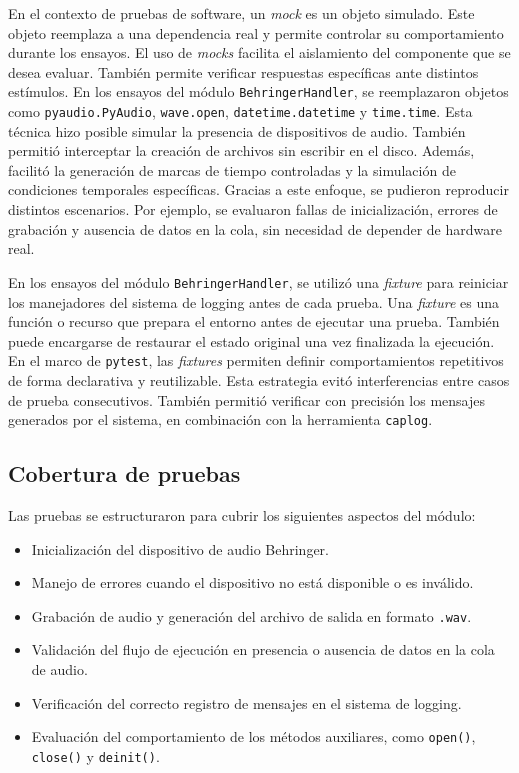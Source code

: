 En el contexto de pruebas de software, un \textit{mock} es un objeto simulado. Este objeto reemplaza a una dependencia real y permite controlar su comportamiento durante los ensayos. El uso de \textit{mocks} facilita el aislamiento del componente que se desea evaluar. También permite verificar respuestas específicas ante distintos estímulos. En los ensayos del módulo \texttt{BehringerHandler}, se reemplazaron objetos como \texttt{pyaudio.PyAudio}, \texttt{wave.open}, \texttt{datetime.datetime} y \texttt{time.time}. Esta técnica hizo posible simular la presencia de dispositivos de audio. También permitió interceptar la creación de archivos sin escribir en el disco. Además, facilitó la generación de marcas de tiempo controladas y la simulación de condiciones temporales específicas. Gracias a este enfoque, se pudieron reproducir distintos escenarios. Por ejemplo, se evaluaron fallas de inicialización, errores de grabación y ausencia de datos en la cola, sin necesidad de depender de hardware real.

En los ensayos del módulo \texttt{BehringerHandler}, se utilizó una \textit{fixture} para reiniciar los manejadores del sistema de logging antes de cada prueba.  Una \textit{fixture} es una función o recurso que prepara el entorno antes de ejecutar una prueba. También puede encargarse de restaurar el estado original una vez finalizada la ejecución. En el marco de \texttt{pytest}, las \textit{fixtures} permiten definir comportamientos repetitivos de forma declarativa y reutilizable.  Esta estrategia evitó interferencias entre casos de prueba consecutivos. También permitió verificar con precisión los mensajes generados por el sistema, en combinación con la herramienta \texttt{caplog}.

\subsection{Cobertura de pruebas}

Las pruebas se estructuraron para cubrir los siguientes aspectos del módulo:

\begin{itemize} \item Inicialización del dispositivo de audio Behringer. \item Manejo de errores cuando el dispositivo no está disponible o es inválido. \item Grabación de audio y generación del archivo de salida en formato \texttt{.wav}. \item Validación del flujo de ejecución en presencia o ausencia de datos en la cola de audio. \item Verificación del correcto registro de mensajes en el sistema de logging. \item Evaluación del comportamiento de los métodos auxiliares, como \texttt{open()}, \texttt{close()} y \texttt{deinit()}. \end{itemize}

